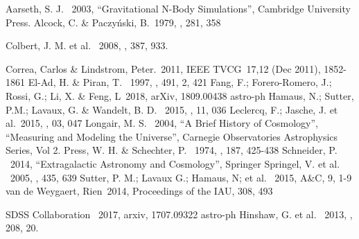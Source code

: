 \documentclass[preprint]{aastex62}
\begin{document}
  \begin{thebibliography}{}
     Aarseth, S. J. \ 2003, ``Gravitational N-Body Simulations'', Cambridge University Press.
     Alcock, C. \& Paczy\'nski, B.\ 1979, \nat, 281, 358    

       Colbert, J. M. et al. \ 2008, \mnras, 387, 933.
      
     Correa, Carlos \& Lindstrom, Peter.\ 2011,  IEEE TVCG\ 17,12 (Dec 2011), 1852-1861
     El-Ad, H. \& Piran, T. \ 1997, \apj, 491, 2, 421
     Fang, F.; Forero-Romero, J.; Rossi, G.; Li, X. \& Feng, L\ 2018, arXiv, 1809.00438 astro-ph
     Hamaus, N.; Sutter, P.M.; Lavaux, G. \& Wandelt, B. D. \ 2015, \jcap, 11, 036    
     Leclercq, F.; Jasche, J. et al.\ 2015, \jcap, 03, 047
     Longair, M. S. \ 2004, ``A Brief History of Cosmology'', ``Measuring and Modeling the Universe'', Carnegie Observatories Astrophysics Series, Vol 2.
     Press, W. H. \& Schechter, P. \ 1974, \apj, 187, 425-438
     Schneider, P. \ 2014, ``Extragalactic Astronomy and Cosmology'', Springer
     Springel, V. et al. \ 2005, \nat, 435, 639
     Sutter, P. M.; Lavaux G.; Hamaus, N; et al. \ 2015, A\&C, 9, 1-9
     van de Weygaert, Rien\ 2014, Proceedings of the IAU, 308, 493      

     SDSS Collaboration \ 2017, arxiv, 1707.09322 astro-ph
     Hinshaw, G. et al. \ 2013, \apjs, 208, 20.
  \end{thebibliography}                                                           
                       

\end{document}
